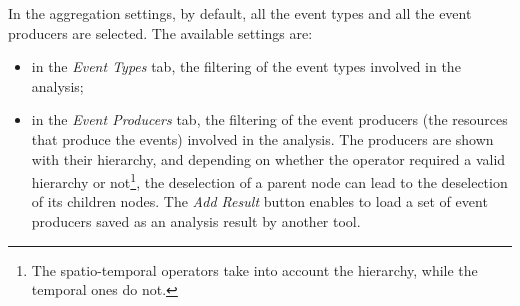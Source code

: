 \documentclass[twoside]{article}
\begin{document}
\begin{sloppypar}
In the aggregation settings, by default, all the event types and all the event producers are selected. The available settings are:
\begin{itemize}
	\item in the \textit{Event Types} tab, the filtering of the event types involved in the analysis;
	\item in the \textit{Event Producers} tab, the filtering of the event producers (the resources that produce the events) involved in the analysis. The producers are shown with their hierarchy, and depending on whether the operator required a valid hierarchy or not\footnote{The spatio-temporal operators take into account the hierarchy, while the temporal ones do not.}, the deselection of a parent node can lead to the deselection of its children nodes. The \textit{Add Result} button enables to load a set of event producers saved as an analysis result by another tool.
\end{itemize}


\end{sloppypar}
\end{document}
